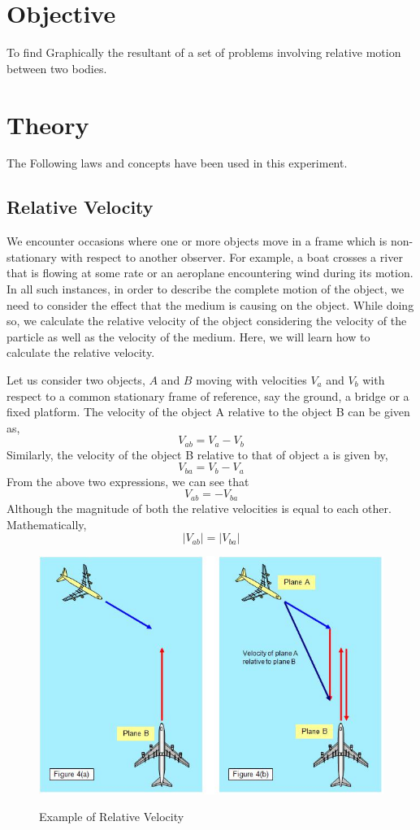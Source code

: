 \documentclass[11pt]{article}
\begin{document}
	
\tableofcontents
\thispagestyle{empty}
\clearpage


\setcounter{page}{1}

\section{Objective}
To find Graphically the resultant of a set of problems involving relative motion between two bodies. 

\section{Theory}
The Following laws and concepts have been used in this experiment.

\subsection{Relative Velocity}
We encounter occasions where one or more objects move in a frame which is non-stationary with respect to another observer. For example, a boat crosses a river that is flowing at some rate or an aeroplane encountering wind during its motion. In all such instances, in order to describe the complete motion of the object, we need to consider the effect that the medium is causing on the object. While doing so, we calculate the relative velocity of the object considering the velocity of the particle as well as the velocity of the medium. Here, we will learn how to calculate the relative velocity.

Let us consider two objects, $A$ and $B$ moving with velocities $V_{a}$ and $V_{b}$ with respect to a common stationary frame of reference, say the ground, a bridge or a fixed platform.
The velocity of the object A relative to the object B can be given as,
$$
V_{a b}=V_{a}-V_{b}
$$
Similarly, the velocity of the object B relative to that of object a is given by,
$$
V_{b a}=V_{b}-V_{a}
$$
From the above two expressions, we can see that
$$
V_{a b}=-V_{b a}
$$
Although the magnitude of both the relative velocities is equal to each other. Mathematically, $$\left|V_{a b}\right|=\left|V_{b a}\right|$$

\begin{figure}[H]
	\centering
	\includegraphics[scale=0.45]{rel vel.jpg}
	\label{fig: Polygon Law}
	\caption{Example of Relative Velocity}
\end{figure}
\end{document}
